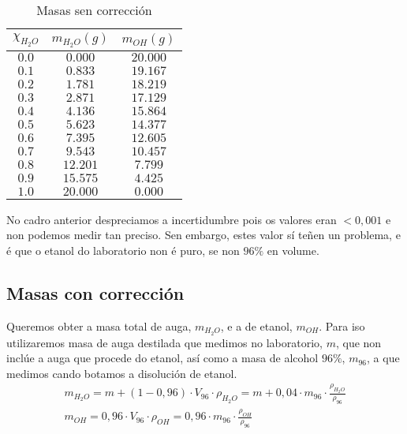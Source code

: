 \documentclass[12pt, a4paper, titlepage]{article}
\begin{document}
  \begin{table}[H]
    \centering
    \begin{tabular}{|c|c|c|}
    \hline
    $\chi_{H_2O}$ & $m_{H_2O} (g)$ & $m_{OH} (g)$ \\ \hline
    $ 0.0 $  &  $ 0.000 $  &  $ 20.000 $ \\ \hline
    $ 0.1 $  &  $ 0.833 $  &  $ 19.167 $ \\ \hline
    $ 0.2 $  &  $ 1.781 $  &  $ 18.219 $ \\ \hline
    $ 0.3 $  &  $ 2.871 $  &  $ 17.129 $ \\ \hline
    $ 0.4 $  &  $ 4.136 $  &  $ 15.864 $ \\ \hline
    $ 0.5 $  &  $ 5.623 $  &  $ 14.377 $ \\ \hline
    $ 0.6 $  &  $ 7.395 $  &  $ 12.605 $ \\ \hline
    $ 0.7 $  &  $ 9.543 $  &  $ 10.457 $ \\ \hline
    $ 0.8 $  &  $ 12.201 $  &  $ 7.799 $ \\ \hline
    $ 0.9 $  &  $ 15.575 $  &  $ 4.425 $ \\ \hline
    $ 1.0 $  &  $ 20.000 $  &  $ 0.000 $ \\ \hline
    \end{tabular}
    \caption{Masas sen corrección}
    \label{cad:masas_sen_correccion}
  \end{table}
  
  No cadro anterior despreciamos a incertidumbre pois os valores eran $<0,001$ e non podemos medir tan preciso. Sen embargo, estes valor sí teñen un problema, e é que o etanol do laboratorio non é puro, se non $96 \%$ en volume.
  
  \subsection{Masas con corrección}

  Queremos obter a masa total de auga, $m_{H_2O}$, e a de etanol, $m_{OH}$. Para iso utilizaremos masa de auga destilada que medimos no laboratorio, $m$, que non inclúe a auga que procede do etanol, así como a masa de alcohol $96 \%$, $m_96$, a que medimos cando botamos a disolución de etanol.
  \begin{gather}
    m_{H_2O} = m + (1 - 0,96) \cdot V_{96} \cdot \rho_{H_2O} = m + 0,04 \cdot m_{96} \cdot \frac{\rho_{H_2O}}{\rho_{96}} \label{ec:masa_real_h2o} \\
    m_{OH} = 0,96 \cdot V_{96} \cdot \rho_{OH} = 0,96 \cdot m_{96} \cdot \frac{\rho_{OH}}{\rho_{96}} \label{ec:masa_real_oh}
  \end{gather}
\end{document}
